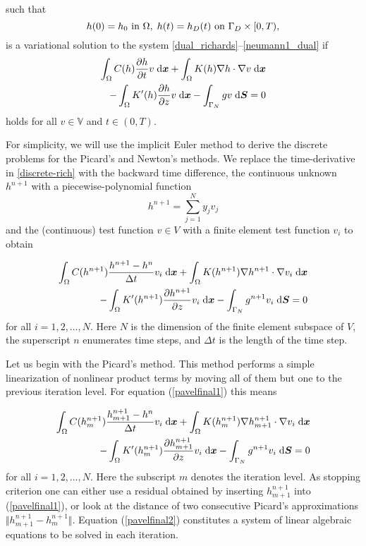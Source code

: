 \documentclass[final,3p,times,twocolumn]{elsarticle}
\newcommand{\bfx}{\mbox{\boldmath $x$}}
\newcommand{\bfS}{\mbox{\boldmath $S$}}
\begin{document}
such that
$$
h(0)=h_0 \textmd{ in } \Omega, \; h(t)=h_D(t) \textmd{ on } \Gamma_D
\times [0,T),
$$
is a variational solution to the system
\eqref{dual_richards}--\eqref{neumann1_dual} if
\begin{equation}
\begin{split}
\int_{\Omega}  C(h)\frac{\partial h}{\partial t}v \;{\rm
d}\bfx + \int_{\Omega} K(h)\nabla h \cdot \nabla v \;{\rm
d}\bfx \\ - \int_{\Omega}K'(h)\frac{\partial h}{\partial z}v \;{\rm
d}\bfx - \int_{\Gamma_N} g v \;{\rm d}\bfS = 0
\end{split}
\label{discrete-rich}
\end{equation}
holds for all $v \in \mathbb{V}$ and $t\in(0,T)$.

For simplicity, we will use the implicit Euler method 
to derive the discrete problems for the Picard's and 
Newton's methods. We replace the time-derivative
in \eqref{discrete-rich} with the backward time difference, 
the continuous unknown $h^{n+1}$ with a piecewise-polynomial function
$$
h^{n+1} = \sum_{j=1}^N y_j v_j
$$
and the (continuous) test function $v \in V$ with a finite 
element test function $v_i$ to obtain 

\begin{equation}
\begin{split}
\int_{\Omega}  C(h^{n+1})\frac{h^{n+1} - h^n}{\Delta t}v_i \;{\rm
d}\bfx + \int_{\Omega} K(h^{n+1})\nabla h^{n+1} \cdot \nabla v_i \;{\rm
d}\bfx \\ - \int_{\Omega}K'(h^{n+1})\frac{\partial h^{n+1}}{\partial z}v_i \;{\rm
d}\bfx - \int_{\Gamma_N} g^{n+1} v_i \;{\rm d}\bfS = 0
\end{split}
\label{pavelfinal1}
\end{equation}
for all $i = 1, 2, \ldots, N$.
Here $N$ is the dimension of the finite element subspace of $V$,
the superscript $n$ enumerates time steps, and $\Delta t$ is the length of the time step. 


Let us begin with the Picard's method. This method performs a simple linearization of 
nonlinear product terms by moving all of them but one to the previous iteration level.
For equation (\ref{pavelfinal1}) this means

\begin{equation}
\begin{split}
\int_{\Omega}  C(h_m^{n+1})\frac{h_{m+1}^{n+1} - h^n}{\Delta t}v_i \;{\rm
d}\bfx + \int_{\Omega} K(h_m^{n+1})\nabla h_{m+1}^{n+1} \cdot \nabla v_i \;{\rm
d}\bfx \\ - \int_{\Omega}K'(h_m^{n+1})\frac{\partial h_{m+1}^{n+1}}{\partial z}v_i \;{\rm
d}\bfx - \int_{\Gamma_N} g^{n+1} v_i \;{\rm d}\bfS = 0
\end{split}
\label{pavelfinal2}
\end{equation}
for all $i = 1, 2, \ldots, N$.
Here the subscript $m$ denotes the iteration level. As stopping criterion one can either 
use a residual obtained by inserting $h_{m+1}^{n+1}$ into (\ref{pavelfinal1}), or look at the 
distance of two consecutive Picard's approximations $\Vert h_{m+1}^{n+1} - h_{m}^{n+1} \Vert$.
Equation (\ref{pavelfinal2}) constitutes a system of linear algebraic equations to be solved
in each iteration.
\end{document}
